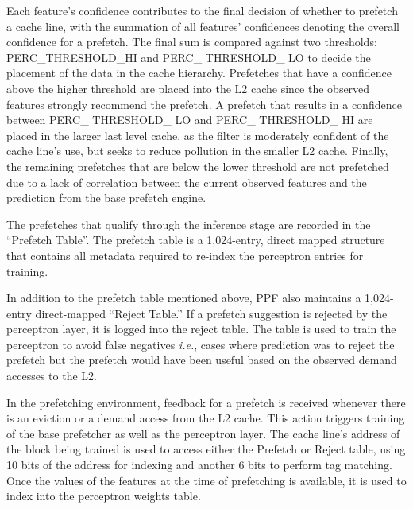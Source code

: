 Each feature's confidence contributes to 
the final decision of whether to prefetch a cache line, with the summation 
of all features' confidences denoting the overall confidence for a prefetch.  
The final sum is compared against two thresholds: PERC\_THRESHOLD\_HI and  
PERC\_ THRESHOLD\_ LO to decide the placement of the data in the cache 
hierarchy. Prefetches that have a confidence above the higher threshold 
are placed into the L2 cache since the observed features strongly recommend  
the prefetch. A prefetch that results in a confidence between 
PERC\_ THRESHOLD\_ LO and PERC\_ THRESHOLD\_ HI are placed in the larger 
last level cache, as the filter is moderately confident of the cache line's 
use, but seeks to reduce pollution in the smaller L2 cache. Finally, the 
remaining prefetches that are below the lower threshold are not prefetched 
due to a lack of correlation between the current observed features and 
the prediction from the base prefetch engine.\newline


\newline 

The prefetches that qualify through the inference stage are recorded in the 
``Prefetch Table''. The prefetch table is a 1,024-entry, direct mapped 
structure that contains all metadata required to re-index the perceptron 
entries for training. 

In addition to the prefetch table mentioned above, 
PPF also maintains a 1,024-entry direct-mapped ``Reject Table.'' 
If a prefetch suggestion is rejected by the perceptron layer, it is logged into 
the reject table. The table is used to train the perceptron to avoid false negatives 
\textit{i.e.}, cases where prediction was to reject the prefetch but 
the prefetch would have been useful based on the observed demand accesses to the L2. \newline

 \newline

In the prefetching environment, feedback for a prefetch is received whenever 
there is an eviction or a demand access from the L2 cache. This action 
triggers training of the base prefetcher as well as the perceptron layer.  
The cache line's address of the block being trained is used to access either the Prefetch
or Reject table, using 10 bits of the address for indexing and another 6 bits to 
perform tag matching.  Once the values of the features at the time of prefetching is available,
it is used to index into the perceptron weights table. \newline

